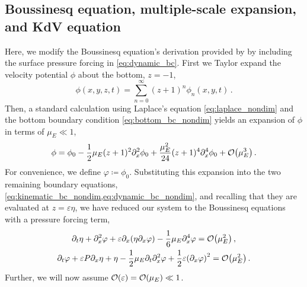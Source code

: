 \documentclass{jfm}
\renewcommand*{\epsilon}{\varepsilon}
\begin{document}
\subsection{Boussinesq equation, multiple-scale expansion, and KdV
equation}
Here, we modify the Boussinesq equation's derivation provided by
\citet{mei2005nonlinear} by including the surface pressure forcing in
\cref{eq:dynamic_bc}.
First we Taylor expand the velocity potential $\phi$ about the bottom,
$z=-1$,
\begin{equation}
  \phi(x,y,z,t) = \sum_{n=0}^\infty (z+1)^n\phi_n(x,y,t) \,.
\end{equation}
Then, a standard calculation \citep[\eg][]{mei2005nonlinear} using
Laplace's equation \cref{eq:laplace_nondim} and the bottom boundary
condition \cref{eq:bottom_bc_nondim} yields an expansion of $\phi$ in
terms of $\mu_E \ll 1$,
\begin{equation}
  \phi = \phi_0 - \frac{1}{2}\mu_E (z+1)^2\partial^2_x\phi_0 +
  \frac{\mu_E^2}{24}(z+1)^4\partial^4_x\phi_0 +
  \order{\mu_E^3} \,.
\end{equation}
For convenience, we define $\varphi \coloneqq \phi_0$.
Substituting this expansion into the two remaining boundary equations,
\cref{eq:kinematic_bc_nondim,eq:dynamic_bc_nondim}, and recalling that
they are evaluated at $z=\epsilon \eta$, we have reduced our system to
the Boussinesq equations with a pressure forcing term,
\begin{gather}
  \partial_t \eta + \partial_x^2 \varphi + \epsilon \partial_x
    \pqty{\eta \partial_x \varphi} -\frac{1}{6}\mu_E \partial^4_x
    \varphi = \order{\mu_E^2} \label{eq:kinematic_bc_varphi} \,, \\
  \partial_t \varphi + \epsilon P \partial_x \eta + \eta -
    \frac{1}{2}\mu_E \partial_t \partial_x^2 \varphi +
    \frac{1}{2}\epsilon\pqty{\partial_x \varphi}^2 = \order{\mu_E^2} \,.
    \label{eq:dynamic_bc_varphi}
\end{gather}
Further, we will now assume $\order{\epsilon} = \order{\mu_E} \ll 1$.
\end{document}

